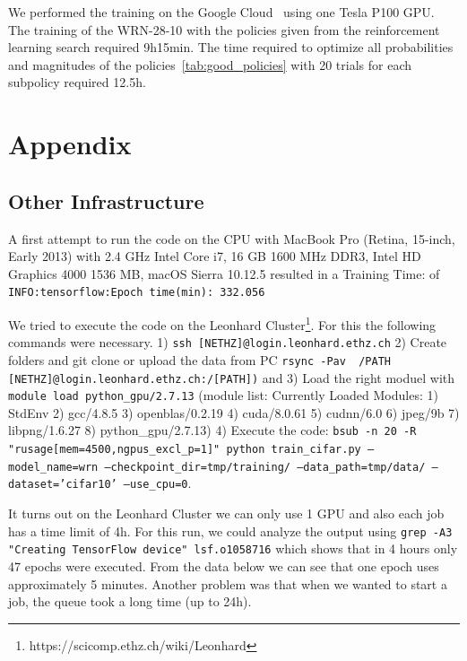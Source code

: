 \documentclass[10pt,twocolumn,letterpaper]{article}
\begin{document}
We performed the training on the Google Cloud~\cite{GCloud} using one Tesla P100 GPU. The training of the WRN-28-10 with the policies given from the reinforcement learning search required 9h15min. The time required to optimize all probabilities and magnitudes of the policies~\ref{tab:good_policies} with 20 trials for each subpolicy required 12.5h. \newline



\section{Appendix}

\subsection{Other Infrastructure}
A first attempt to run the code on the CPU with MacBook Pro (Retina, 15-inch, Early 2013) with 2.4 GHz Intel Core i7, 16 GB 1600 MHz DDR3, Intel HD Graphics 4000 1536 MB, macOS Sierra 10.12.5 resulted in a Training Time: of \texttt{INFO:tensorflow:Epoch time(min): 332.056} \newline

We tried to execute the code on the Leonhard Cluster\footnote{https://scicomp.ethz.ch/wiki/Leonhard}. For this the following commands were necessary. 1) \texttt{ssh [NETHZ]@login.leonhard.ethz.ch} 2) Create folders and git clone or upload the data from PC \texttt{rsync -Pav ~/PATH [NETHZ]@login.leonhard.ethz.ch:/[PATH])} and 3) Load the right moduel with \texttt{module load python\_gpu/2.7.13} (module list: Currently Loaded Modules: 1) StdEnv   2) gcc/4.8.5   3) openblas/0.2.19   4) cuda/8.0.61   5) cudnn/6.0   6) jpeg/9b   7) libpng/1.6.27   8) python\_gpu/2.7.13) 4) Execute the code: \texttt{bsub -n 20 -R "rusage[mem=4500,ngpus\_excl\_p=1]" python train\_cifar.py --model\_name=wrn --checkpoint\_dir=tmp/training/ --data\_path=tmp/data/ --dataset='cifar10' --use\_cpu=0}. \newline

It turns out on the Leonhard Cluster we can only use 1 GPU and also each job has a time limit of 4h. For this run, we could analyze the output using \texttt{grep -A3 "Creating TensorFlow device" lsf.o1058716} which shows that in 4 hours only 47 epochs were executed. From the data below we can see that one epoch uses approximately 5 minutes. Another problem was that when we wanted to start a job, the queue took a long time (up to 24h). \newline
\end{document}
